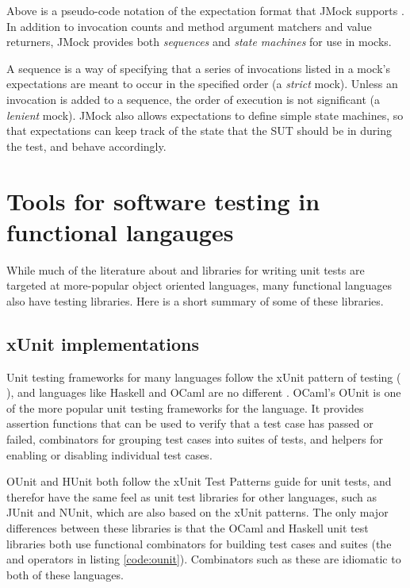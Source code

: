 Above is a pseudo-code notation of the expectation format that JMock
supports \cite{freeman:growing}. In addition to invocation counts and
method argument matchers and value returners, JMock provides both
\textit{sequences} and \textit{state machines} for use in mocks.

A sequence is a way of specifying that a series of invocations listed
in a mock's expectations are meant to occur in the specified order (a
\textit{strict} mock). Unless an invocation is added to a sequence,
the order of execution is not significant (a \textit{lenient}
mock). JMock also allows expectations to define simple state machines,
so that expectations can keep track of the state that the SUT should
be in during the test, and behave accordingly.

\section{Tools for software testing in functional langauges}
\label{testtools}

While much of the literature about and libraries for writing unit
tests are targeted at more-popular object oriented languages,
many functional languages also have testing libraries. Here is a short
summary of some of these libraries.

\subsection{xUnit implementations}

Unit testing frameworks for many languages follow the xUnit pattern of
testing (\cite{www:junit} \cite{www:nunit} \cite{www:ruby:unit}), and
languages like Haskell and OCaml are no different \cite{www:hunit}
\cite{www:ounit}. OCaml's OUnit is one of the more popular unit
testing frameworks for the language. It provides assertion functions
that can be used to verify that a test case has passed or failed,
combinators for grouping test cases into suites of tests, and helpers
for enabling or disabling individual test cases.



OUnit and HUnit both follow the xUnit Test Patterns guide for unit
tests, and therefor have the same feel as unit test libraries for
other languages, such as JUnit and NUnit, which are also based on the
xUnit patterns. The only major differences between these libraries is
that the OCaml and Haskell unit test libraries both use functional
combinators for building test cases and suites (the \code{>::} and
\code{>:::} operators in listing \ref{code:ounit}). Combinators such
as these are idiomatic to both of these languages.

